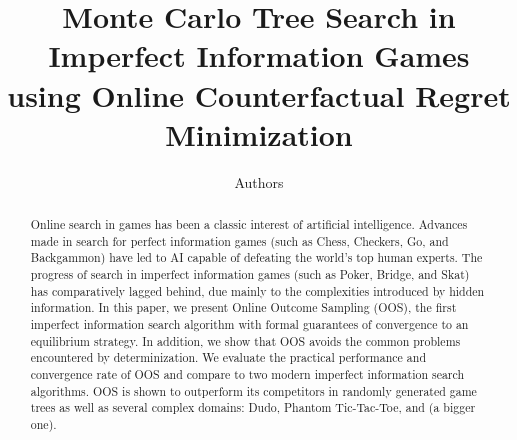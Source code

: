 \documentclass[letterpaper]{article}
\begin{document}
%
\title{Monte Carlo Tree Search in Imperfect Information Games\\using Online Counterfactual Regret Minimization}
\author{Authors}

\newcommand{\vlnote}[1]{{\scriptsize \color{blue} $\blacksquare$ \refstepcounter{vlNoteCounter}\textsf{[VL]$_{\arabic{vlNoteCounter}}$:{#1}}}}
\newcommand{\mlnote}[1]{{\scriptsize \color{darkgreen} $\blacksquare$ \refstepcounter{mlNoteCounter}\textsf{[ML]$_{\arabic{mlNoteCounter}}$:{#1}}}}
\newcommand{\asnote}[1]{{\scriptsize \color{red} $\blacktriangle$ \refstepcounter{asNoteCounter}\textsf{[AS]$_{\arabic{asNoteCounter}}$:{#1}}}}


\maketitle

\begin{abstract}
Online search in games has been a classic interest of artificial intelligence.
Advances made in search for perfect information games (such as Chess, Checkers, Go, and Backgammon) have led to AI capable of defeating the world's top human experts. 
The progress of search in imperfect information games (such as Poker, Bridge, and Skat) has comparatively lagged behind, due mainly to the complexities introduced by hidden information. 
In this paper, we present Online Outcome Sampling (OOS), the first imperfect information search algorithm with formal guarantees of convergence to an equilibrium strategy.   
In addition, we show that OOS avoids the common problems encountered by determinization.
We evaluate the practical performance and convergence rate of OOS and compare to two modern imperfect information search algorithms.
OOS is shown to outperform its competitors in randomly generated game trees as well as several complex domains: 
Dudo, Phantom Tic-Tac-Toe, and (a bigger one). 
\end{abstract}
\end{document}
